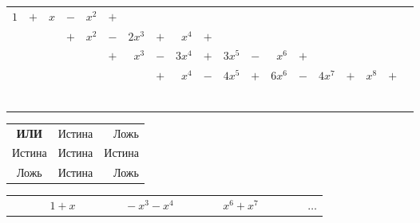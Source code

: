 \documentclass[a4paper,12pt]{article} %
\begin{document}
	\begin{table}[h!]
		\begin{tabular}{*{19}{r@{$\;$}}}
			$1$ & $+$ & $x$ & $-$ & $x^2$ & $+$ & & & & & & & & & & & & & \\
			& & & $+$ & $x^2$ & $-$ & $2x^3$ & $+$ & $x^4$ & $+$ & & & & & & & & & \\
			& & & & & $+$ & $x^3$ & $-$ &$3x^4$ & $+$ & $3x^5$ & $-$ & $x^6$ & $+$ & & & & & \\
			& & & & & & & $+$ & $x^4$ & $-$ & $4x^5$ & $+$ & $6x^6$ & $-$ & $4x^7$ & $+$ & $x^8$ & $+$ & \\
			& & & & & & & & & & & & & & & & & & \\
			& & & & & & & & & & & & & & & & & & \\
			& & & & & & & & & & & & & & & & & & \\
			& & & & & & & & & & & & & & & & & & \\
			& & & & & & & & & & & & & & & & & & \\
			& & & & & & & & & & & & & & & & & & \\
		\end{tabular}
	
	\begin{tabular}{c||p{2cm}@{$\pm$\ }r|}
		\textbf{ИЛИ} & Истина & Ложь \\[2mm]
		\cline{2-3}
		Истина & Истина & Истина \\
		\cline{1-1}\cline{3-3}
		Ложь & Истина & Ложь\\ \cline{2-2}
	\end{tabular}
	
	\end{table}
\begin{table}[h!]
	\begin{tabulary}{\textwidth}{CCCC}
		$\; \qquad \; \; \; \; 1 + x$ & 
		$\; \qquad \; \; \; \; -x^3 -x^4$ & 
		$\; \qquad \; \; \; \; x^6 + x^7$ & 
		$\; \qquad \; \; \; \; \dots$
	\end{tabulary}
\end{table}

\end{document}
